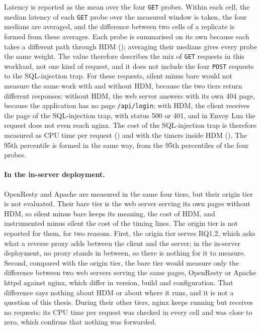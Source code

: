 \documentclass{rptuma}
\begin{document}
Latency is reported as the mean over the four \texttt{GET} probes. Within each cell, the
median latency of each \texttt{GET} probe over the measured window is taken, the four medians are
averaged, and the difference between two cells of a replicate is formed from these averages. Each
probe is summarised on its own because each takes a different path through HDM
(); averaging their medians gives every probe the same weight. The
value therefore describes the mix of \texttt{GET} requests in this workload, not one kind of request,
and it does not include the four \texttt{POST} requests to the SQL-injection trap. For these
requests, silent minus bare would not measure the same work with and without HDM, because the two
tiers return different responses: without HDM, the web server answers with its own 404 page,
because the application has no page \texttt{/api/login}; with HDM, the client receives the page of
the SQL-injection trap, with status 500 or 401, and in Envoy Lua the request does not even reach
nginx. The cost of the SQL-injection trap is therefore measured as CPU time per request
() and with the timers inside HDM (). The 95th percentile is
formed in the same way, from the 95th percentiles of the four probes.

\paragraph{In the in-server deployment.} OpenResty and Apache are measured in the same four
tiers, but their origin tier is not evaluated. Their bare tier is the web server serving its own
pages without HDM, so silent minus bare keeps its meaning, the cost of HDM, and instrumented minus
silent the cost of the timing lines. The origin tier is not reported for them, for two reasons. First,
the origin tier serves RQ1.2, which asks what a reverse proxy adds between the client and the
server; in the in-server deployment, no proxy stands in between, so there is nothing for it to
measure. Second, compared with the origin tier, the bare tier would measure only the difference
between two web servers serving the same pages, OpenResty or Apache httpd against nginx, which
differ in version, build and configuration. That difference says nothing about HDM or about where
it runs, and it is not a question of this thesis. During their other tiers, nginx keeps running but receives no
requests; its CPU time per request was checked in every cell and was close to zero, which confirms that nothing was
forwarded.
\end{document}
